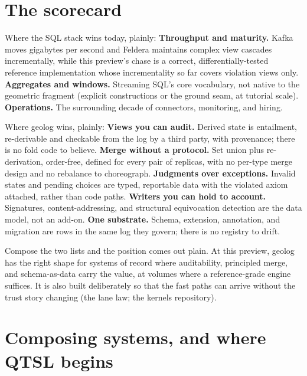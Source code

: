 \section{The scorecard}
\label{sec:gt-scorecard}

Where the SQL stack wins today, plainly: \textbf{Throughput and
maturity.} Kafka moves gigabytes per second and Feldera maintains
complex view cascades incrementally, while this preview's chase is a
correct, differentially-tested reference implementation whose
incrementality so far covers violation views only. \textbf{Aggregates
and windows.} Streaming SQL's core vocabulary, not native to the
geometric fragment (explicit constructions or the ground seam, at
tutorial scale). \textbf{Operations.} The surrounding decade of
connectors, monitoring, and hiring.

Where geolog wins, plainly: \textbf{Views you can audit.} Derived
state is entailment, re-derivable and checkable from the log by a
third party, with provenance; there is no fold code to believe.
\textbf{Merge without a protocol.} Set union plus re-derivation,
order-free, defined for every pair of replicas, with no per-type merge
design and no rebalance to choreograph. \textbf{Judgments over
exceptions.} Invalid states and pending choices are typed, reportable
data with the violated axiom attached, rather than code paths.
\textbf{Writers you can hold to account.} Signatures,
content-addressing, and structural equivocation detection are the data
model, not an add-on. \textbf{One substrate.} Schema, extension,
annotation, and migration are rows in the same log they govern; there
is no registry to drift.

Compose the two lists and the position comes out plain. At this
preview, geolog has the right shape for systems of record where
auditability, principled merge, and schema-as-data carry the value, at
volumes where a reference-grade engine suffices. It is also built
deliberately so that the fast paths can arrive without the trust story
changing (the lane law; the kernels repository).

\section{Composing systems, and where QTSL begins}
\label{sec:gt-onward}

